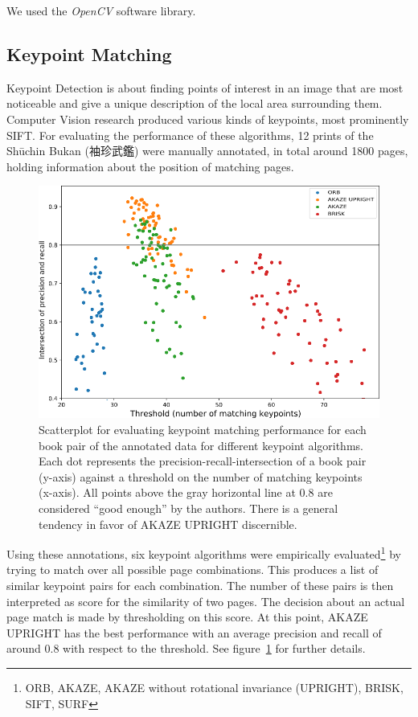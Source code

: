 \documentclass{ltjarticle}
\begin{document}
We used the \emph{OpenCV} software library.\cite{opencv_library}

\subsection{Keypoint Matching}

Keypoint Detection\cite[Ch.4]{szeliski2010computer} is about finding points of interest in an image that are most noticeable and give a unique description of the local area surrounding them. Computer Vision research produced various kinds of keypoints, most prominently SIFT\cite{lowe2004sift}. For evaluating the performance of these algorithms, 12 prints of the Shūchin Bukan (袖珍武鑑) were manually annotated, in total around 1800 pages, holding information about the position of matching pages.

\begin{figure}
    \centering
    \includegraphics[width=\textwidth]{keypointevaluation}
    \caption[Scatterplot of keypoint matching performance]{Scatterplot for evaluating keypoint matching performance for each book pair of the annotated data for different keypoint algorithms. Each dot represents the precision-recall-intersection of a book pair (y-axis) against a threshold on the number of matching keypoints (x-axis). All points above the gray horizontal line at $0.8$ are considered “good enough” by the authors. There is a general tendency in favor of AKAZE UPRIGHT discernible.}
    \label{fig:keypoint-evaluation}
\end{figure}

Using these annotations, six keypoint algorithms were empirically evaluated\footnote{ORB\cite{rublee2011orb}, AKAZE\cite{alcantarilla2011fast}, AKAZE without rotational invariance (UPRIGHT), BRISK\cite{leutenegger2011brisk}, SIFT, SURF\cite{bay2006surf}} by trying to match over all possible page combinations. This produces a list of similar keypoint pairs for each combination. The number of these pairs is then interpreted as score for the similarity of two pages. The decision about an actual page match is made by thresholding on this score. At this point, AKAZE UPRIGHT has the best performance with an average precision and recall of around $0.8$ with respect to the threshold. See figure~\ref{fig:keypoint-evaluation} for further details.
\end{document}
